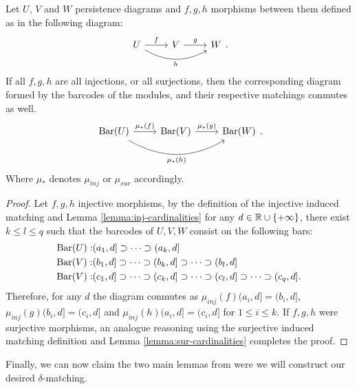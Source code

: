 \begin{lemma} \label{lemma:functoriality}
    Let $ U$, $V$ and $W$ persistence diagrams and $f, g, h$ morphisms between them defined as in the following diagram:
    $$
        \begin{tikzcd}
            U \arrow[r, "f"] \arrow[rr, "h"', bend right] & V \arrow[r, "g"] & W
        \end{tikzcd}.
    $$
    If all $ f, g, h$ are all injections, or all surjections, then the corresponding diagram formed by the barcodes of the modules, and their respective matchings conmutes as well.
    $$
        \begin{tikzcd}
            \barc(U) \arrow[r, "\mu_*(f)"] \arrow[rr, "\mu_*(h)"', bend right] & \barc(V) \arrow[r, "\mu_*(g)"] & \barc(W)
        \end{tikzcd}.
    $$
    Where $ \mu_* $ denotes $ \mu_{inj} $ or $ \mu_{sur} $ accordingly.
\end{lemma}
\begin{proof}
    Let $f, g, h$ injective morphisms, by the definition of the injective induced matching and Lemma \ref{lemma:inj-cardinalities} for any $ d \in \mathbb R \cup \{+ \infty\}$, there exist $ k \leq l \leq q $ such that the barcodes of $ U, V, W$ consist on the following bars:
    \begin{align*}
        \operatorname{Bar}(U):& (a_1, d] \supset \cdots \supset (a_k, d] \\
        \operatorname{Bar}(V):& (b_1, d] \supset \cdots \supset (b_k, d] \supset \cdots \supset (b_l, d] \\
        \operatorname{Bar}(V):& (c_1, d] \supset \cdots \supset (c_k, d] \supset \cdots \supset (c_l, d] \supset \cdots \supset (c_q, d]. \\
    \end{align*}
    Therefore, for any $ d $ the diagram conmutes as $\mu_{inj}(f)(a_i, d] = (b_i, d]$, $\mu_{inj}(g)(b_i, d] = (c_i, d]$ and $\mu_{inj}(h)(a_i, d] = (c_i, d]$ for $ 1 \leq i \leq k$. If $f, g, h$ were surjective morphisms, an analogue reasoning using the surjective induced matching definition and Lemma \ref{lemma:sur-cardinalities} completes the proof.
\end{proof}


Finally, we can now claim the two main lemmas from were we will construct our desired $\delta$-matching.

